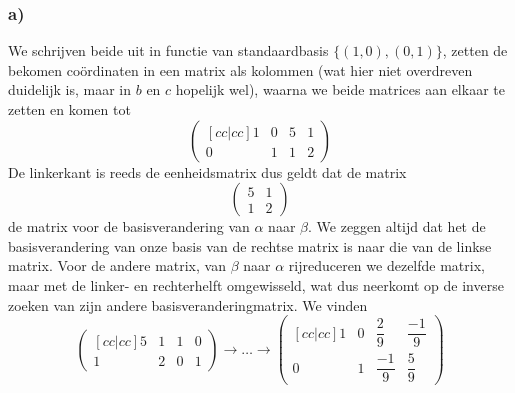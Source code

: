 \documentclass[lineaire_algebra_oplossingen.tex]{subfiles}
\begin{document}
\subsubsection*{a)}
We schrijven beide uit in functie van standaardbasis $\{(1,0), (0,1)\}$, zetten de bekomen co\"ordinaten in een matrix als kolommen (wat hier niet overdreven duidelijk is, maar in $b$ en $c$ hopelijk wel), waarna we beide matrices aan elkaar te zetten en komen tot
\[
\begin{pmatrix}[cc|cc]
1 & 0 & 5 & 1\\
0 & 1 & 1 & 2
\end{pmatrix}
\]
De linkerkant is reeds de eenheidsmatrix dus geldt dat de matrix 
\[
\begin{pmatrix}
5 & 1\\
1 & 2
\end{pmatrix}
\]
de matrix voor de basisverandering van $\alpha$ naar $\beta$. We zeggen altijd dat het de basisverandering van onze basis van de rechtse matrix is naar die van de linkse matrix. Voor de andere matrix, van $\beta$ naar $\alpha$ rijreduceren we dezelfde matrix, maar met de linker- en rechterhelft omgewisseld, wat dus neerkomt op de inverse zoeken van zijn andere basisveranderingmatrix. We vinden
\[
\begin{pmatrix}[cc|cc]
5 & 1 & 1 & 0\\
1 & 2 & 0 & 1
\end{pmatrix}
\longrightarrow \dots \longrightarrow
\begin{pmatrix}[cc|cc]
1 & 0 & \dfrac{2}{9}  & \dfrac{-1}{9} \\[6pt]
0 & 1 & \dfrac{-1}{9} & \dfrac{5}{9}
\end{pmatrix}
\]
\end{document}
